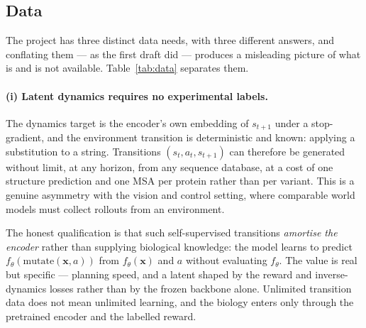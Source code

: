 \documentclass[12pt, a4paper]{article}
\begin{document}
\subsection{Data}
\label{sec:data}

The project has three distinct data needs, with three different answers, and conflating them --- as the first draft did --- produces a misleading picture of what is and is not available. Table~\ref{tab:data} separates them.

\paragraph{(i) Latent dynamics requires no experimental labels.} The dynamics target is the encoder's own embedding of $s_{t+1}$ under a stop-gradient, and the environment transition is deterministic and known: applying a substitution to a string. Transitions $(s_t, a_t, s_{t+1})$ can therefore be generated without limit, at any horizon, from any sequence database, at a cost of one structure prediction and one MSA per protein rather than per variant. This is a genuine asymmetry with the vision and control setting, where comparable world models must collect rollouts from an environment.

The honest qualification is that such self-supervised transitions \textit{amortise the encoder} rather than supplying biological knowledge: the model learns to predict $f_\theta(\mathrm{mutate}(\mathbf{x}, a))$ from $f_\theta(\mathbf{x})$ and $a$ without evaluating $f_\theta$. The value is real but specific --- planning speed, and a latent shaped by the reward and inverse-dynamics losses rather than by the frozen backbone alone. Unlimited transition data does not mean unlimited learning, and the biology enters only through the pretrained encoder and the labelled reward.
\end{document}
